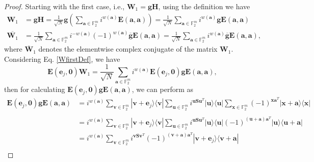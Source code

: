 \documentclass[lettersize,journal,onecolumn]{IEEEtran}
\begin{document}
\begin{proof}
	Starting with the first case, i.e., $\mathbf{W}_1=\mathbf{g H}$, using the definition we have
	\begin{align}
		\mathbf{W}_1 &= \mathbf{g}\mathbf{H} = \frac{1}{\sqrt{N}}\mathbf{g}\left(\sum_{\mathbf{a} \in \mathbb{F}^m_2} i^{w(\mathbf{a})}\mathbf{E}(\mathbf{a},\mathbf{a})\right) = \frac{1}{\sqrt{N}}\sum_{\mathbf{a} \in \mathbb{F}^m_2} i^{w(\mathbf{a})}\mathbf{g}\mathbf{E}(\mathbf{a},\mathbf{a}) \label{WfirstDef} \\
		\overline{\mathbf{W}_1} &= \frac{1}{\sqrt{N}}\sum_{\mathbf{a} \in \mathbb{F}^m_2} i^{-w(\mathbf{a})}(-1)^{w(\mathbf{a})}\overline{\mathbf{g}}\mathbf{E}(\mathbf{a},\mathbf{a}) = \frac{1}{\sqrt{N}}\sum_{\mathbf{a} \in \mathbb{F}^m_2} i^{w(\mathbf{a})}\overline{\mathbf{g}}\mathbf{E}(\mathbf{a},\mathbf{a}), \label{WbarFirstDef}
	\end{align}
where $\overline{\mathbf{W}}_1$ denotes the elementwise complex conjugate of the matrix $\mathbf{W}_1$. Considering Eq. \eqref{WfirstDef}, we have
\begin{equation}\label{EjW1}
	\mathbf{E}(\mathbf{e}_j, \mathbf{0})\mathbf{W}_1 = \frac{1}{\sqrt{N}} \sum_{\mathbf{a} \in \mathbb{F}^m_2} i^{w(\mathbf{a})}\mathbf{E}(\mathbf{e}_j,\mathbf{0})\mathbf{g}\mathbf{E}(\mathbf{a},\mathbf{a}),
\end{equation}
then for calculating  $\mathbf{E}(\mathbf{e}_j,\mathbf{0})\mathbf{g}\mathbf{E}(\mathbf{a},\mathbf{a})$, we can perform as
\begin{align*}
	\mathbf{E}(\mathbf{e}_j,\mathbf{0})\mathbf{g}\mathbf{E}(\mathbf{a},\mathbf{a})& = 	i^{w(\mathbf{a})}  \sum_{\mathbf{v} \in \mathbb{F}_2^m}{ |\mathbf{v}+\mathbf{e}_j \rangle  \langle \mathbf{v}|}  \sum_{\mathbf{u} \in \mathbb{F}_2^m}{i^{\mathbf{u S}\mathbf{u}^T} |\mathbf{u} \rangle  \langle \mathbf{u}|}\sum_{\mathbf{x} \in \mathbb{F}_2^m}{ (-1)^{\mathbf{x}\mathbf{a}^T}|\mathbf{x+a}\rangle  \langle\mathbf{x}|} \\
	\\
	&= i^{w(\mathbf{a})}  \sum_{\mathbf{v} \in \mathbb{F}_2^m}{ |\mathbf{v}+\mathbf{e}_j \rangle  \langle \mathbf{v}|}  \sum_{\mathbf{u} \in \mathbb{F}_2^m}{i^{\mathbf{u S}\mathbf{u}^T} |\mathbf{u}\rangle  \langle\mathbf{u}|} (-1)^{(\mathbf{u+a})\mathbf{a}^T}|\mathbf{u} \rangle  \langle \mathbf{u+a}| \\
	&= i^{w(\mathbf{a})} \sum_{\mathbf{v} \in \mathbb{F}_2^m}{i^{\mathbf{v}\mathbf{S}\mathbf{v}^T}(-1)^{(\mathbf{v+a})\mathbf{a}^T} |\mathbf{v}+\mathbf{e}_j \rangle  \langle \mathbf{v+a}|} \\

\end{align*}
\end{proof}
\end{document}
